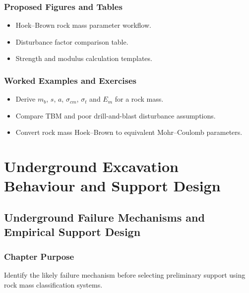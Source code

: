 \documentclass[12pt,oneside]{book}
\begin{document}
\section{Proposed Figures and Tables}
\begin{itemize}
    \item Hoek--Brown rock mass parameter workflow.
    \item Disturbance factor comparison table.
    \item Strength and modulus calculation templates.
\end{itemize}

\section{Worked Examples and Exercises}
\begin{itemize}
    \item Derive \(m_b\), \(s\), \(a\), \(\sigma_{cm}\), \(\sigma_t\) and \(E_m\) for a rock mass.
    \item Compare TBM and poor drill-and-blast disturbance assumptions.
    \item Convert rock mass Hoek--Brown to equivalent Mohr--Coulomb parameters.
\end{itemize}

\part{Underground Excavation Behaviour and Support Design}

\chapter{Underground Failure Mechanisms and Empirical Support Design}

\section{Chapter Purpose}
Identify the likely failure mechanism before selecting preliminary support using rock mass classification systems.
\end{document}
